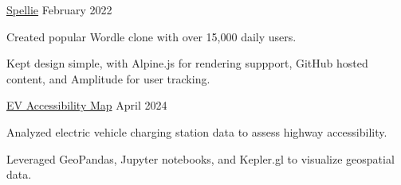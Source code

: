 


\begin{cventries}

  \cventry
    {\href{https://spelliegame.com/}{Spellie}} %
    {}
    {}
    {February 2022}
    {
      \begin{cvitems} %
        \item{Created popular Wordle clone with over 15,000 daily users.}
        \item{Kept design simple, with Alpine.js for rendering suppport, GitHub hosted content, and Amplitude for user tracking.}
      \end{cvitems}
    }

  \cventry
    {\href{https://github.com/canadianveggie/ev-map}{EV Accessibility Map}} %
    {}
    {}
    {April 2024}
    {
      \begin{cvitems} %
        \item{Analyzed electric vehicle charging station data to assess highway accessibility.}
        \item{Leveraged GeoPandas, Jupyter notebooks, and Kepler.gl to visualize geospatial data.}
      \end{cvitems}
    }

\end{cventries}
